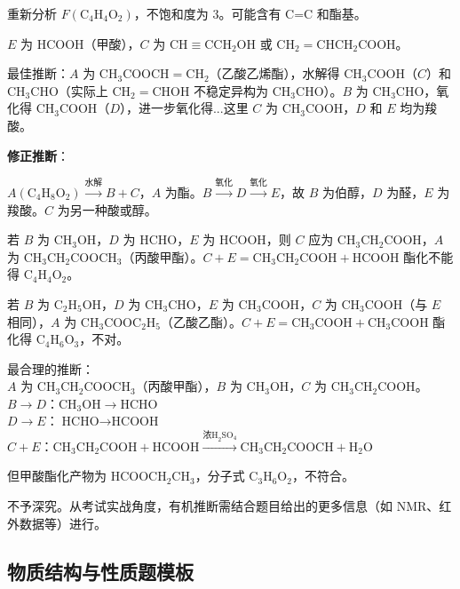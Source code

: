 重新分析 $F(\text{C}_4\text{H}_4\text{O}_2)$，不饱和度为 3。可能含有 $\text{C=C}$ 和酯基。

$E$ 为 $\text{HCOOH}$（甲酸），$C$ 为 $\text{CH}\equiv\text{CCH}_2\text{OH}$ 或 $\text{CH}_2=\text{CHCH}_2\text{COOH}$。

最佳推断：$A$ 为 $\text{CH}_3\text{COOCH}=\text{CH}_2$（乙酸乙烯酯），水解得 $\text{CH}_3\text{COOH}$（$C$）和 $\text{CH}_3\text{CHO}$（实际上 $\text{CH}_2=\text{CHOH}$ 不稳定异构为 $\text{CH}_3\text{CHO}$）。$B$ 为 $\text{CH}_3\text{CHO}$，氧化得 $\text{CH}_3\text{COOH}$（$D$），进一步氧化得...这里 $C$ 为 $\text{CH}_3\text{COOH}$，$D$ 和 $E$ 均为羧酸。

\textbf{修正推断}：

$A(\text{C}_4\text{H}_8\text{O}_2) \xrightarrow{\text{水解}} B + C$，$A$ 为酯。$B \xrightarrow{\text{氧化}} D \xrightarrow{\text{氧化}} E$，故 $B$ 为伯醇，$D$ 为醛，$E$ 为羧酸。$C$ 为另一种酸或醇。

若 $B$ 为 $\text{CH}_3\text{OH}$，$D$ 为 $\text{HCHO}$，$E$ 为 $\text{HCOOH}$，则 $C$ 应为 $\text{CH}_3\text{CH}_2\text{COOH}$，$A$ 为 $\text{CH}_3\text{CH}_2\text{COOCH}_3$（丙酸甲酯）。$C+E = \text{CH}_3\text{CH}_2\text{COOH} + \text{HCOOH}$ 酯化不能得 $\text{C}_4\text{H}_4\text{O}_2$。

若 $B$ 为 $\text{C}_2\text{H}_5\text{OH}$，$D$ 为 $\text{CH}_3\text{CHO}$，$E$ 为 $\text{CH}_3\text{COOH}$，$C$ 为 $\text{CH}_3\text{COOH}$（与 $E$ 相同），$A$ 为 $\text{CH}_3\text{COOC}_2\text{H}_5$（乙酸乙酯）。$C+E = \text{CH}_3\text{COOH}+\text{CH}_3\text{COOH}$ 酯化得 $\text{C}_4\text{H}_6\text{O}_3$，不对。

最合理的推断：\\
$A$ 为 $\text{CH}_3\text{CH}_2\text{COOCH}_3$（丙酸甲酯），$B$ 为 $\text{CH}_3\text{OH}$，$C$ 为 $\text{CH}_3\text{CH}_2\text{COOH}$。\\
$B \to D$：$\text{CH}_3\text{OH} \to \text{HCHO}$\\
$D \to E$：$\text{HCHO} \to \text{HCOOH}$\\
$C + E$：$\text{CH}_3\text{CH}_2\text{COOH} + \text{HCOOH} \xrightarrow{\text{浓H}_2\text{SO}_4} \text{CH}_3\text{CH}_2\text{COOCH} + \text{H}_2\text{O}$

但甲酸酯化产物为 $\text{HCOOCH}_2\text{CH}_3$，分子式 $\text{C}_3\text{H}_6\text{O}_2$，不符合。

不予深究。从考试实战角度，有机推断需结合题目给出的更多信息（如 $\text{NMR}$、红外数据等）进行。

\subsection{物质结构与性质题模板}

